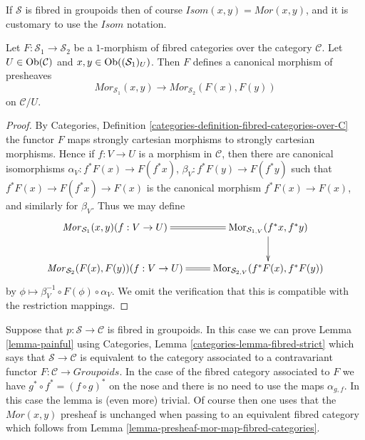 \noindent
If $\mathcal{S}$ is fibred in groupoids then of course
$\mathit{Isom}(x, y) = \mathit{Mor}(x, y)$, and it is
customary to use the $\mathit{Isom}$ notation.

\begin{lemma}
\label{lemma-presheaf-mor-map-fibred-categories}
Let $F : \mathcal{S}_1 \to \mathcal{S}_2$ be a $1$-morphism of fibred
categories over the category $\mathcal{C}$. Let $U \in \mathop{\mathrm{Ob}}\nolimits(\mathcal{C})$
and $x, y\in \mathop{\mathrm{Ob}}\nolimits((\mathcal{S}_1)_U)$. Then $F$ defines a canonical
morphism of presheaves
$$
\mathit{Mor}_{\mathcal{S}_1}(x, y)
\longrightarrow
\mathit{Mor}_{\mathcal{S}_2}(F(x), F(y))
$$
on $\mathcal{C}/U$.
\end{lemma}

\begin{proof}
By
Categories, Definition \ref{categories-definition-fibred-categories-over-C}
the functor $F$ maps strongly cartesian morphisms to strongly cartesian
morphisms. Hence if $f : V \to U$ is a morphism in $\mathcal{C}$, then
there are canonical isomorphisms $\alpha_V : f^*F(x) \to F(f^*x)$,
$\beta_V : f^*F(y) \to F(f^*y)$ such that $f^*F(x) \to F(f^*x) \to F(x)$
is the canonical morphism $f^*F(x) \to F(x)$, and similarly for $\beta_V$.
Thus we may define
$$
\xymatrix{
\mathit{Mor}_{\mathcal{S}_1}(x, y)(f : V \to U) \ar@{=}[r] &
\Mor_{\mathcal{S}_{1, V}}(f^\ast x, f^\ast y) \ar[d] \\
\mathit{Mor}_{\mathcal{S}_2}(F(x), F(y))(f : V \to U) \ar@{=}[r] &
\Mor_{\mathcal{S}_{2, V}}(f^\ast F(x), f^\ast F(y))
}
$$
by $\phi \mapsto \beta_V^{-1} \circ F(\phi) \circ \alpha_V$.
We omit the verification that this is compatible with the restriction
mappings.
\end{proof}

\begin{remark}
\label{remark-alternative}
Suppose that $p : \mathcal{S} \to \mathcal{C}$ is fibred in groupoids.
In this case we can prove
Lemma \ref{lemma-painful}
using
Categories, Lemma \ref{categories-lemma-fibred-strict}
which says that $\mathcal{S} \to \mathcal{C}$ is equivalent to the
category associated to a contravariant functor
$F : \mathcal{C} \to \textit{Groupoids}$.
In the case of the fibred category associated to $F$
we have $g^* \circ f^* = (f \circ g)^*$ on the nose
and there is no need to use the maps $\alpha_{g, f}$.
In this case the lemma is (even more) trivial. Of course then
one uses that the $\mathit{Mor}(x, y)$ presheaf is
unchanged when passing to an equivalent fibred category which follows from
Lemma \ref{lemma-presheaf-mor-map-fibred-categories}.
\end{remark}

